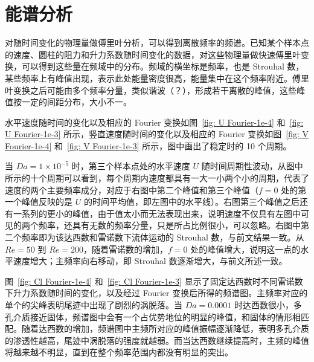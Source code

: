 \section{能谱分析}\label{sec: energy spectrum} %

对随时间变化的物理量做傅里叶分析，可以得到离散频率的频谱。已知某个样本点的速度、圆柱的阻力和升力系数随时间变化的数据，对这些物理量做快速傅里叶变换，可以得到这些量在频域中的分布。频域的横坐标是频率，也是 Strouhal 数，某些频率上有峰值出现，表示此处能量密度很高，能量集中在这个频率附近。傅里叶变换之后可能由多个频率分量，类似谐波（？），形成若干离散的峰值，这些峰值按一定的间距分布，大小不一。

水平速度随时间的变化以及相应的 Fourier 变换如图~\ref{fig: U Fourier-1e-4} 和~\ref{fig: U Fourier-1e-3} 所示，竖直速度随时间的变化以及相应的 Fourier 变换如图~\ref{fig: V Fourier-1e-4} 和~\ref{fig: V Fourier-1e-3} 所示，图中画出了稳定时的 10 个周期。

当 $Da=1\times 10^{-5}$ 时，第三个样本点处的水平速度 $U$ 随时间周期性波动，从图中所示的十个周期可以看到，每个周期内速度都具有一大一小两个小的周期，代表了速度的两个主要频率成分，对应于右图中第二个峰值和第三个峰值（$f=0$ 处的第一个峰值反映的是 $U$ 的时间平均值，即左图中的水平线）。右图第三个峰值之后还有一系列的更小的峰值，由于值太小而无法表现出来，说明速度不仅具有左图中可见的两个频率，还具有无数的频率分量，只是所占比例很小，可以忽略。右图中第二个频率即为该达西数和雷诺数下流体运动的 Strouhal 数，与前文结果一致。从 $Re=50$ 到 $Re=200$，随着雷诺数的增加，$f=0$ 处的峰值增大，说明这一点的水平速度增大；主频率向右移动，即 Strouhal 数逐渐增大，与前文所述一致。

图~\ref{fig: Cl Fourier-1e-4} 和~\ref{fig: Cl Fourier-1e-3} 显示了固定达西数时不同雷诺数下升力系数随时间的变化，以及经过 Fourier 变换后所得的频谱图。主频率对应的单个的尖峰表明尾迹中出现了剧烈的涡脱落。当 $Da=0.0001$ 时达西数很小，多孔介质接近固体，频谱图中会有一个占优势地位的明显的峰值，和固体的情形相匹配。随着达西数的增加，频谱图中主频所对应的峰值振幅逐渐降低，表明多孔介质的渗透性越高，尾迹中涡脱落的强度就越弱。而当达西数继续提高时，主频的峰值将越来越不明显，直到在整个频率范围内都没有明显的突出。

